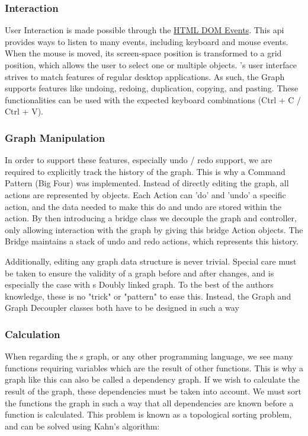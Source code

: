 \subsubsection{ Interaction }
User Interaction is made possible through the \href{https://developer.mozilla.org/en-US/docs/web/api/event}{HTML DOM Events}. 
This api provides ways to listen to many events, including keyboard and mouse events. 
When the mouse is moved, its screen-space position is transformed to a grid position, which allows the user to select one or multiple objects. 
\geofront{}'s user interface strives to match features of regular desktop applications. As such, the \geofront{} Graph supports features like undoing, redoing, duplication, copying, and pasting. These functionalities can be used with the expected keyboard combinations (Ctrl + C / Ctrl + V).

\subsubsection*{ Graph Manipulation }
In order to support these features, especially undo / redo support, we are required to explicitly track the history of the graph. 
This is why a Command Pattern (Big Four) was implemented.
Instead of directly editing the graph, all actions are represented by  objects. 
Each Action can 'do' and 'undo' a specific action, and the data needed to make this do and undo are stored within the action. 
By then introducing a bridge class we decouple the graph and controller, only allowing interaction with the graph by giving this bridge Action objects. The Bridge maintains a stack of undo and redo actions, which represents this history.  

Additionally, editing any graph data structure is never trivial. 
Special care must be taken to ensure the validity of a graph before and after changes, and is especially the case with \geofront{}s Doubly linked graph. 
To the best of the authors knowledge, these is no "trick" or "pattern" to ease this. Instead, the Graph and Graph Decoupler classes both have to be designed in such a way 

\subsubsection*{Calculation}
When regarding the \geofront{}s graph, or any other programming language, we see many functions requiring variables which are the result of other functions. 
This is why a graph like this can also be called a dependency graph. 
If we wish to calculate the result of the graph, these dependencies must be taken into account. We must sort the functions the graph in such a way that all dependencies are known before a function is calculated.
This problem is known as a topological sorting problem, and can be solved using Kahn's algorithm: 

